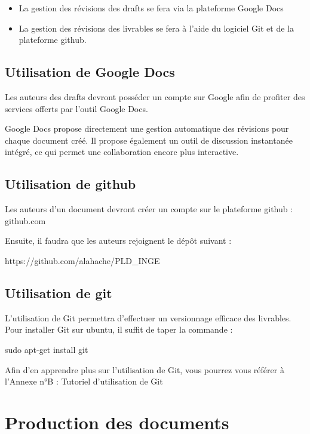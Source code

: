 \documentclass{mise_en_page}
\begin{document}
\begin{itemize}
\item La gestion des révisions des drafts se fera via la plateforme
Google Docs
\end{itemize}
\begin{itemize}
\item La gestion des révisions des livrables se fera à l’aide du
logiciel Git et de la plateforme github.
\end{itemize}



\subsection{Utilisation de
Google Docs}
Les auteurs des drafts devront posséder un compte sur Google afin de
profiter des services offerts par l’outil Google Docs.




Google Docs propose directement une gestion automatique des révisions
pour chaque document créé. Il propose également un outil de discussion
instantanée intégré, ce qui permet une collaboration encore plus
interactive.

\subsection{Utilisation de github}
Les auteurs d’un document devront créer un compte sur le plateforme
github : github.com 




Ensuite, il faudra que les auteurs rejoignent le dépôt suivant :

https://github.com/alahache/PLD\_INGE




\subsection{Utilisation de git}




L’utilisation de Git permettra d’effectuer un versionnage efficace des
livrables. Pour installer Git sur ubuntu, il suffit de taper la
commande :

sudo apt-get install git




Afin d’en apprendre plus sur l’utilisation de Git, vous pourrez vous
référer à l’Annexe n°B : Tutoriel d’utilisation de Git

\section{Production des documents}
\end{document}

